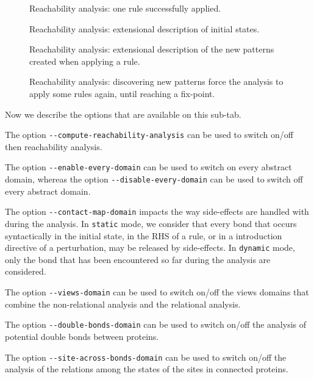 \documentclass[11pt]{book}
\begin{document}
\begin{figure}[htbp]

\caption{Reachability analysis: one rule successfully applied.}
\label{fig:reachability_medium_ok}
\end{figure}

\begin{figure}[htbp]

\caption{Reachability analysis: extensional description of initial states.}
\label{fig:reachability_high_init}
\end{figure}

\begin{figure}[htbp]

\caption{Reachability analysis: extensional description of the new patterns  created when applying a rule.}
\label{fig:reachability_high_rule}
\end{figure}

\begin{figure}[htbp]

\caption{Reachability analysis: discovering new patterns force the analysis to apply some rules again, until reaching a fix-point.}
\label{fig:reachability_full}
\end{figure}

Now we describe the options that are available on this sub-tab.

The option \verb?--compute-reachability-analysis? can be used to switch on/off then reachability analysis.

The option \verb?--enable-every-domain? can be used to switch on every abstract domain, whereas the option \verb?--disable-every-domain? can be used to switch off every abstract domain.

The option \verb?--contact-map-domain? impacts the way side-effects are handled with during the analysis. In \verb?static? mode, we consider that every bond that occurs syntactically in the initial state, in the RHS of a rule, or in a introduction directive of a perturbation, may be released by side-effects.
In \verb?dynamic? mode, only the bond that has been encountered so far during the analysis are considered.

The option \verb?--views-domain? can be used to switch on/off the views domains that combine the non-relational analysis and the relational analysis.

The option \verb?--double-bonds-domain? can be used to switch on/off the analysis of potential double bonds between proteins.

The option \verb?--site-across-bonds-domain? can be used to switch on/off the analysis of the relations among the states of the sites in connected proteins.
\end{document}
